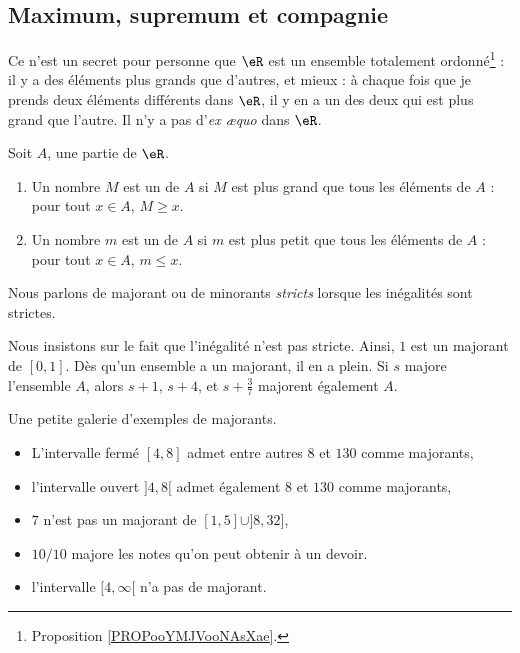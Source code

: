 \subsection{Maximum, supremum et compagnie}

Ce n'est un secret pour personne que \( \eR\) est un ensemble totalement ordonné\footnote{Proposition \ref{PROPooYMJVooNAsXae}.} : il y a des éléments plus grands que d'autres, et mieux : à chaque fois que je prends deux éléments différents dans \( \eR\), il y en a un des deux qui est plus grand que l'autre. Il n'y a pas d'\emph{ex æquo} dans \( \eR\).

\begin{definition}
	Soit \( A\), une partie de \( \eR\).
	\begin{enumerate}
		\item
		      Un nombre \( M\) est un  de \( A\) si \( M\) est plus grand que tous les éléments de \( A\) : pour tout \( x\in A\), \( M\geq x\).
		\item
		      Un nombre \( m\) est un  de \( A\) si \( m\) est plus petit que tous les éléments de \( A\) : pour tout \( x\in A\), \( m\leq x\).
	\end{enumerate}
	Nous parlons de majorant ou de minorants \emph{stricts} lorsque les inégalités sont strictes.
\end{definition}

Nous insistons sur le fait que l'inégalité n'est pas stricte. Ainsi, \( 1\) est un majorant de \( [0,1]\). Dès qu'un ensemble a un majorant, il en a plein. Si \( s\) majore l'ensemble \( A\), alors \( s+1\), \( s+4\), et \( s+\frac{ 3 }{ 7 }\) majorent également \( A\).

\begin{example}
	Une petite galerie d'exemples de majorants.
	\begin{itemize}
		\item L'intervalle fermé \( [4,8]\) admet entre autres \( 8\) et \( 130\) comme majorants,
		\item l'intervalle ouvert \( ]4,8[\) admet également \( 8\) et \( 130\) comme majorants,
		\item \( 7\) n'est pas un majorant de \( [1,5]\cup]8,32]\),
		\item \( 10/10\) majore les notes qu'on peut obtenir à un devoir.
		\item l'intervalle \( [4,\infty[\) n'a pas de majorant.
	\end{itemize}
\end{example}

